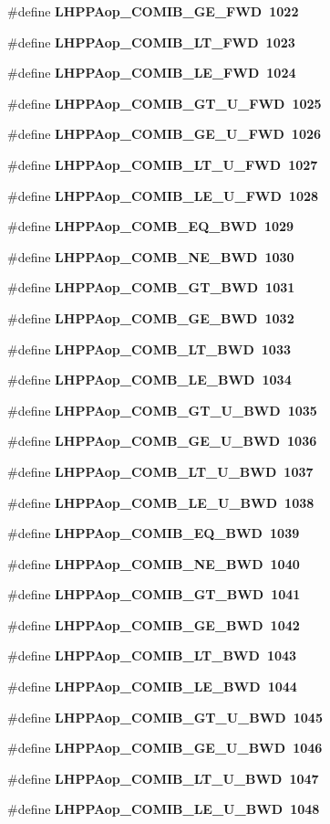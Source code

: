 \begin{CompactItemize}
\#define \bf{LHPPAop\_\-COMIB\_\-GE\_\-FWD}~1022
\item 
\#define \bf{LHPPAop\_\-COMIB\_\-LT\_\-FWD}~1023
\item 
\#define \bf{LHPPAop\_\-COMIB\_\-LE\_\-FWD}~1024
\item 
\#define \bf{LHPPAop\_\-COMIB\_\-GT\_\-U\_\-FWD}~1025
\item 
\#define \bf{LHPPAop\_\-COMIB\_\-GE\_\-U\_\-FWD}~1026
\item 
\#define \bf{LHPPAop\_\-COMIB\_\-LT\_\-U\_\-FWD}~1027
\item 
\#define \bf{LHPPAop\_\-COMIB\_\-LE\_\-U\_\-FWD}~1028
\item 
\#define \bf{LHPPAop\_\-COMB\_\-EQ\_\-BWD}~1029
\item 
\#define \bf{LHPPAop\_\-COMB\_\-NE\_\-BWD}~1030
\item 
\#define \bf{LHPPAop\_\-COMB\_\-GT\_\-BWD}~1031
\item 
\#define \bf{LHPPAop\_\-COMB\_\-GE\_\-BWD}~1032
\item 
\#define \bf{LHPPAop\_\-COMB\_\-LT\_\-BWD}~1033
\item 
\#define \bf{LHPPAop\_\-COMB\_\-LE\_\-BWD}~1034
\item 
\#define \bf{LHPPAop\_\-COMB\_\-GT\_\-U\_\-BWD}~1035
\item 
\#define \bf{LHPPAop\_\-COMB\_\-GE\_\-U\_\-BWD}~1036
\item 
\#define \bf{LHPPAop\_\-COMB\_\-LT\_\-U\_\-BWD}~1037
\item 
\#define \bf{LHPPAop\_\-COMB\_\-LE\_\-U\_\-BWD}~1038
\item 
\#define \bf{LHPPAop\_\-COMIB\_\-EQ\_\-BWD}~1039
\item 
\#define \bf{LHPPAop\_\-COMIB\_\-NE\_\-BWD}~1040
\item 
\#define \bf{LHPPAop\_\-COMIB\_\-GT\_\-BWD}~1041
\item 
\#define \bf{LHPPAop\_\-COMIB\_\-GE\_\-BWD}~1042
\item 
\#define \bf{LHPPAop\_\-COMIB\_\-LT\_\-BWD}~1043
\item 
\#define \bf{LHPPAop\_\-COMIB\_\-LE\_\-BWD}~1044
\item 
\#define \bf{LHPPAop\_\-COMIB\_\-GT\_\-U\_\-BWD}~1045
\item 
\#define \bf{LHPPAop\_\-COMIB\_\-GE\_\-U\_\-BWD}~1046
\item 
\#define \bf{LHPPAop\_\-COMIB\_\-LT\_\-U\_\-BWD}~1047
\item 
\#define \bf{LHPPAop\_\-COMIB\_\-LE\_\-U\_\-BWD}~1048
\item 

\end{CompactItemize}
